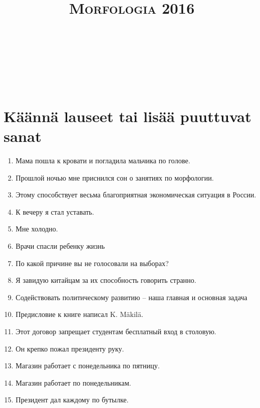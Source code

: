 \documentclass[paper=a4, fontsize=11pt]{scrartcl}
\title{	
\normalfont \normalsize 
\textsc{Morfologia 2016} \\ [25pt] 
\horrule{0.5pt} \\[0.4cm] 
\huge  \\ 
\horrule{2pt} \\[0.5cm] 
}
\date{}
\begin{document}
\onehalfspacing

\section{Käännä lauseet tai lisää puuttuvat sanat}

\begin{enumerate}
    \item Мама пошла к кровати и погладила мальчика по голове. 
    \item Прошлой ночью мне приснился сон о занятиях по морфологии. 
    \item  Этому способствует весьма благоприятная экономическая ситуация в России.
    \item К вечеру я стал уставать. 
    \item Мне холодно. 
    \item  Врачи спасли ребенку жизнь
    \item По какой причине вы не голосовали на выборах? 
    \item Я завидую китайцам за их способность говорить странно.
    \item  Содействовать политическому развитию  -- наша главная и основная задача
    \item Предисловие к книге написал K. Mäkilä. 
    \item Этот договор запрещает студентам бесплатный вход в столовую.
    \item Он крепко пожал президенту руку.
    \item Магазин работает с понедельника по пятницу.
    \item Магазин работает по понедельникам.
    \item Президент дал каждому по бутылке.
\end{enumerate}
\end{document}
